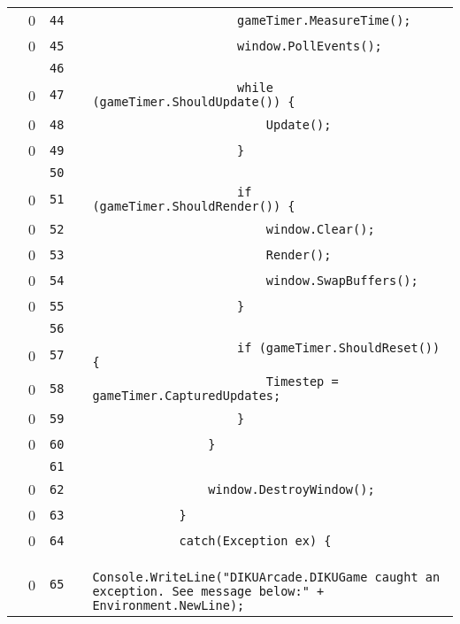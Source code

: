 \documentclass[a4paper,landscape,10pt]{article}
\begin{document}
\begin{longtable}[l]{lrrll}
\cellcolor{red} & 0 & \verb~44~ & & \verb~                    gameTimer.MeasureTime();~\\
\cellcolor{red} & 0 & \verb~45~ & & \verb~                    window.PollEvents();~\\
\cellcolor{gray} &  & \verb~46~ & & \verb~~\\
\cellcolor{red} & 0 & \verb~47~ & & \verb~                    while (gameTimer.ShouldUpdate()) {~\\
\cellcolor{red} & 0 & \verb~48~ & & \verb~                        Update();~\\
\cellcolor{red} & 0 & \verb~49~ & & \verb~                    }~\\
\cellcolor{gray} &  & \verb~50~ & & \verb~~\\
\cellcolor{red} & 0 & \verb~51~ & & \verb~                    if (gameTimer.ShouldRender()) {~\\
\cellcolor{red} & 0 & \verb~52~ & & \verb~                        window.Clear();~\\
\cellcolor{red} & 0 & \verb~53~ & & \verb~                        Render();~\\
\cellcolor{red} & 0 & \verb~54~ & & \verb~                        window.SwapBuffers();~\\
\cellcolor{red} & 0 & \verb~55~ & & \verb~                    }~\\
\cellcolor{gray} &  & \verb~56~ & & \verb~~\\
\cellcolor{red} & 0 & \verb~57~ & & \verb~                    if (gameTimer.ShouldReset()) {~\\
\cellcolor{red} & 0 & \verb~58~ & & \verb~                        Timestep = gameTimer.CapturedUpdates;~\\
\cellcolor{red} & 0 & \verb~59~ & & \verb~                    }~\\
\cellcolor{red} & 0 & \verb~60~ & & \verb~                }~\\
\cellcolor{gray} &  & \verb~61~ & & \verb~~\\
\cellcolor{red} & 0 & \verb~62~ & & \verb~                window.DestroyWindow();~\\
\cellcolor{red} & 0 & \verb~63~ & & \verb~            }~\\
\cellcolor{red} & 0 & \verb~64~ & & \verb~            catch(Exception ex) {~\\
\cellcolor{red} & 0 & \verb~65~ & & \verb~                Console.WriteLine("DIKUArcade.DIKUGame caught an exception. See message below:" + Environment.NewLine);~\\

\end{longtable}
\end{document}

